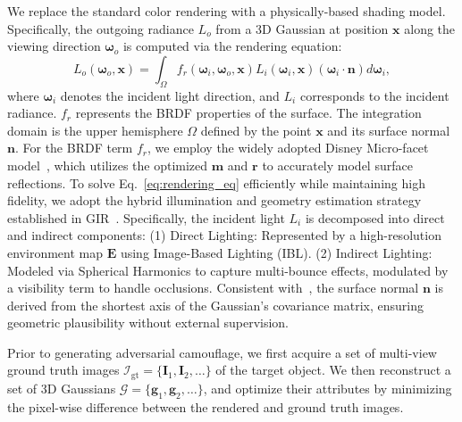 \documentclass[10pt,journal,compsoc]{IEEEtran}
\begin{document}
We replace the standard color rendering with a physically-based shading model. Specifically, the outgoing radiance $L_o$ from a 3D Gaussian at position $\mathbf{x}$ along the viewing direction $\boldsymbol{\omega}_o$ is computed via the rendering equation:
\begin{equation}
    L_o(\boldsymbol{\omega}_o, \mathbf{x}) = \int_{\Omega} f_r(\boldsymbol{\omega}_i, \boldsymbol{\omega}_o, \mathbf{x}) L_i(\boldsymbol{\omega}_i, \mathbf{x}) (\boldsymbol{\omega}_i \cdot \mathbf{n}) d\boldsymbol{\omega}_i,
    \label{eq:rendering_eq}
\end{equation}
where $\boldsymbol{\omega}_i$ denotes the incident light direction, and $L_i$ corresponds to the incident radiance. $f_r$ represents the BRDF properties of the surface. The integration domain is the upper hemisphere $\Omega$ defined by the point $\mathbf{x}$ and its surface normal $\mathbf{n}$.
For the BRDF term $f_r$, we employ the widely adopted Disney Micro-facet model~\cite{burley2012disney}, which utilizes the optimized $\bm{m}$ and $\bm{r}$ to accurately model surface reflections.
To solve Eq.~\eqref{eq:rendering_eq} efficiently while maintaining high fidelity, we adopt the hybrid illumination and geometry estimation strategy established in GIR~\cite{shi2025gir}. 
Specifically, the incident light $L_i$ is decomposed into direct and indirect components:
(1) Direct Lighting: Represented by a high-resolution environment map $\mathbf{E}$ using Image-Based Lighting (IBL).
(2) Indirect Lighting: Modeled via Spherical Harmonics to capture multi-bounce effects, modulated by a visibility term to handle occlusions.
Consistent with~\cite{shi2025gir}, the surface normal $\mathbf{n}$ is derived from the shortest axis of the Gaussian's covariance matrix, ensuring geometric plausibility without external supervision.

Prior to generating adversarial camouflage, we first acquire a set of multi-view ground truth images $\mathcal{I}_{\text{gt}} = \{\bm{I}_1, \bm{I}_2, \dots\}$ of the target object.
We then reconstruct a set of 3D Gaussians $\mathcal{G} = \{\bm{g}_1, \bm{g}_2, \dots\}$, and optimize their attributes by minimizing the pixel-wise difference between the rendered and ground truth images. 
\end{document}
